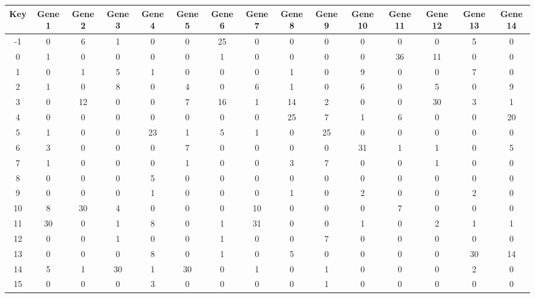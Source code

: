 \begin{tabular}{|c|c|c|c|c|c|c|c|c|c|c|c|c|c|c|}
\hline
Key & Gene 1 & Gene 2 & Gene 3 & Gene 4 & Gene 5 & Gene 6 & Gene 7 & Gene 8 & Gene 9 & Gene 10 & Gene 11 & Gene 12 & Gene 13 & Gene 14 \\
\hline
-1 & 0 & 6 & 1 & 0 & 0 & 25 & 0 & 0 & 0 & 0 & 0 & 0 & 5 & 0 \\
0 & 1 & 0 & 0 & 0 & 0 & 1 & 0 & 0 & 0 & 0 & 36 & 11 & 0 & 0 \\
1 & 0 & 1 & 5 & 1 & 0 & 0 & 0 & 1 & 0 & 9 & 0 & 0 & 7 & 0 \\
2 & 1 & 0 & 8 & 0 & 4 & 0 & 6 & 1 & 0 & 6 & 0 & 5 & 0 & 9 \\
3 & 0 & 12 & 0 & 0 & 7 & 16 & 1 & 14 & 2 & 0 & 0 & 30 & 3 & 1 \\
4 & 0 & 0 & 0 & 0 & 0 & 0 & 0 & 25 & 7 & 1 & 6 & 0 & 0 & 20 \\
5 & 1 & 0 & 0 & 23 & 1 & 5 & 1 & 0 & 25 & 0 & 0 & 0 & 0 & 0 \\
6 & 3 & 0 & 0 & 0 & 7 & 0 & 0 & 0 & 0 & 31 & 1 & 1 & 0 & 5 \\
7 & 1 & 0 & 0 & 0 & 1 & 0 & 0 & 3 & 7 & 0 & 0 & 1 & 0 & 0 \\
8 & 0 & 0 & 0 & 5 & 0 & 0 & 0 & 0 & 0 & 0 & 0 & 0 & 0 & 0 \\
9 & 0 & 0 & 0 & 1 & 0 & 0 & 0 & 1 & 0 & 2 & 0 & 0 & 2 & 0 \\
10 & 8 & 30 & 4 & 0 & 0 & 0 & 10 & 0 & 0 & 0 & 7 & 0 & 0 & 0 \\
11 & 30 & 0 & 1 & 8 & 0 & 1 & 31 & 0 & 0 & 1 & 0 & 2 & 1 & 1 \\
12 & 0 & 0 & 1 & 0 & 0 & 1 & 0 & 0 & 7 & 0 & 0 & 0 & 0 & 0 \\
13 & 0 & 0 & 0 & 8 & 0 & 1 & 0 & 5 & 0 & 0 & 0 & 0 & 30 & 14 \\
14 & 5 & 1 & 30 & 1 & 30 & 0 & 1 & 0 & 1 & 0 & 0 & 0 & 2 & 0 \\
15 & 0 & 0 & 0 & 3 & 0 & 0 & 0 & 0 & 1 & 0 & 0 & 0 & 0 & 0 \\
\hline
\end{tabular}